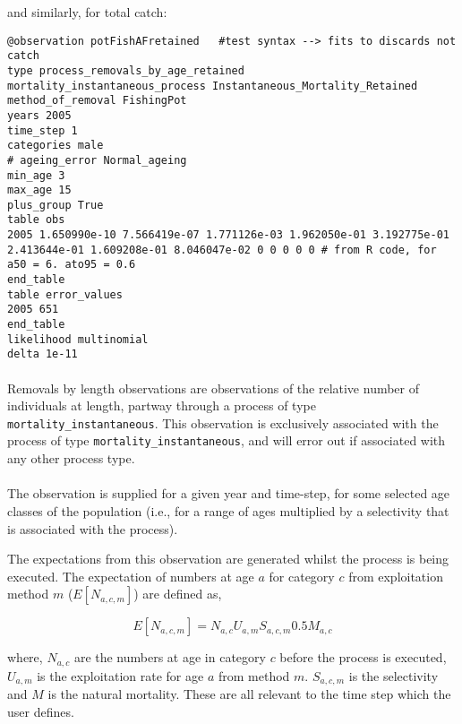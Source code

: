 \begin{itemize}
and similarly, for total catch:

{\small{\begin{verbatim}
@observation potFishAFretained   #test syntax --> fits to discards not catch
type process_removals_by_age_retained
mortality_instantaneous_process Instantaneous_Mortality_Retained
method_of_removal FishingPot
years 2005
time_step 1
categories male
# ageing_error Normal_ageing
min_age 3
max_age 15
plus_group True
table obs
2005 1.650990e-10 7.566419e-07 1.771126e-03 1.962050e-01 3.192775e-01 2.413644e-01 1.609208e-01 8.046047e-02 0 0 0 0 0 # from R code, for a50 = 6. ato95 = 0.6
end_table
table error_values
2005 651
end_table
likelihood multinomial
delta 1e-11
\end{verbatim}}}
	


\paragraph*{\label{sec:removals-by-length}}
Removals by length observations are observations of the relative number of individuals at length, partway through a process of type \texttt{mortality\_instantaneous}. This observation is exclusively associated with the process of type \texttt{mortality\_instantaneous}, and will error out if associated with any other process type.
\\\\
The observation is supplied for a given year and time-step, for some selected age classes of the population (i.e., for a range of ages multiplied by a selectivity that is associated with the process).

The expectations from this observation are generated whilst the process is being executed. The expectation of numbers at age $a$ for category $c$ from exploitation method $m$ ($E[N_{a,c,m}]$) are defined as,


\begin{equation}
E[N_{a,c,m}] = N_{a,c} U_{a,m} S_{a,c,m} 0.5 M_{a,c}
\end{equation}

where, $N_{a,c}$ are the numbers at age in category $c$ before the process is executed, $U_{a,m}$ is the exploitation rate for age $a$ from method $m$. $S_{a,c,m}$ is the selectivity and $M$ is the natural mortality. These are all relevant to the time step which the user defines.


\end{itemize}
